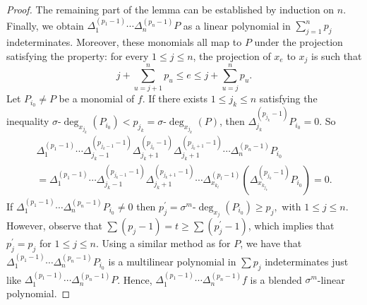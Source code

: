 \documentclass[10pt,a4paper]{amsart}
\begin{document}
\begin{proof}
	The remaining part of the lemma can be established by induction on $n$.  Finally, we obtain $\Delta^{(p_1-1)}_{{1}}\cdots \Delta^{(p_n-1)}_{n} P$ as a linear polynomial in $\sum^{n}_{j=1} p_j$ indeterminates. Moreover, these monomials all map to $P$ under the projection satisfying the property: for every $1\leq j\leq n$, the projection of $x_{e}$ to $x_{j}$ is such that $$  j+\sum_{u=j+1}^{n} p_u\leq  e\leq j+\sum_{u=j}^{n} p_u.$$
	Let $ P_{i_0}\ne P$ be a monomial of $f$. If  there exists  $1\leq j_k\leq n$ satisfying the inequality  $\sigma $-$\deg_{x_{{j_k}}}(P_{i_0})< p_{j_k}=\sigma$-$\deg_{x_{j_k}}(P) $, then $\Delta_{{j_k}}^{(p_{j_k}-1)}P_{i_0}=0 $. So 
	\begin{multline*}
	\Delta^{(p_1-1)}_{{1}}\cdots\Delta^{(p_{j_k-1}-1)}_{j_k-1}\Delta^{(p_{j_k}-1)}_{j_k+1}\Delta^{(p_{j_k+1}-1)}_{j_k+1}\cdots \Delta^{(p_n-1)}_{n} P_{i_0} \\ 
	= \Delta^{(p_1-1)}_{{1}}\cdots\Delta^{(p_{j_k-1}-1)}_{j_k-1}\Delta^{(p_{j_k+1}-1)}_{j_k+1}\cdots \Delta^{(p_l-1)}_{x_{k_l}}  \left(\Delta^{(p_{j_k}-1)}_{x_{k_{j_k}}} P_{i_0}\right) =0.
	\end{multline*}    
	If $\Delta^{(p_1-1)}_{1}\cdots \Delta^{(p_n-1)}_{{n}} P_{i_0}\ne 0$ then $p_j^{'}=\sigma^m$-$\deg_{x_j}(P_{i_0})\geq p_j ,$ with $1\leq j\leq n. $ However, observe that $\sum (p_j-1)=t\geq \sum (p^{'}_j-1)$, which implies that $ p^{'}_{j}=p_j$ for $1\leq j\leq n.$ Using a similar method as for $P$, we have that $\Delta^{(p_1-1)}_{1}\cdots \Delta^{(p_n-1)}_{{n}} P_{i_0}$ is a multilinear polynomial in $\sum p_j$  indeterminates just like $\Delta^{(p_1-1)}_{1}\cdots \Delta^{(p_n-1)}_{n} P$. Hence, $\Delta^{(p_1-1)}_{1}\cdots \Delta^{(p_n-1)}_{{n}} f$ is a blended $\sigma^m$-linear polynomial.
\end{proof}
\end{document}
